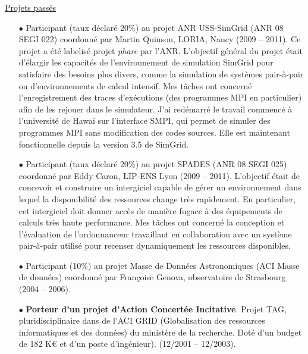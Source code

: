 \documentclass[11pt]{article}
\begin{document}
\underline{Projets passés}\\
\begin{itemize}
\item[$\bullet$]
Participant (taux déclaré 20\%) au projet ANR USS-SimGrid (ANR 08 SEGI 022) coordonné par 
Martin Quinson, LORIA, Nancy (2009 -- 2011). Ce projet a été labelisé projet \textit{phare}
par l'ANR.
L'objectif général du projet était  d'élargir les capacités 
de l'environnement de simulation SimGrid pour satisfaire des besoins plus divers, comme la
simulation de systèmes pair-à-pair ou d'environnements de calcul intensif.
Mes tâches ont concerné l'enregistrement des traces d'exécutions (des programmes MPI en 
particulier) afin de les rejouer dans le simulateur. J'ai redémarré
le travail commencé à l'université de Hawaï sur l'interface SMPI, qui permet de simuler des 
programmes MPI sans modification des codes sources. Elle est maintenant fonctionnelle depuis
la version 3.5 de SimGrid.\\


\item[$\bullet$]
Participant (taux déclaré 20\%) au projet SPADES (ANR 08 SEGI 025) coordonné par Eddy Caron, 
LIP-ENS Lyon (2009 -- 2011). L'objectif était de concevoir et construire un intergiciel capable 
de gérer un environnement dans lequel la disponibilité des ressources change très rapidement. 
En particulier, cet intergiciel doit donner accès de manière fugace à des équipements de calculs 
très haute performance. Mes tâches ont concerné la conception et l'évaluation de l'ordonnanceur
travaillant en collaboration avec un système pair-à-pair utilisé pour recenser dynamiquement
les ressources disponibles.\\


\item[$\bullet$] Participant (10\%) au projet Masse de Données Astronomiques (ACI Masse de données) 
coordonné par Françoise Genova, observatoire de Strasbourg (2004 -- 2006). \\

\item[$\bullet$]
\textbf{Porteur d'un projet d'Action Concertée Incitative}. Projet TAG, 
pluridisciplinaire dans de l'ACI GRID (Globalisation des ressources informatiques et des données) 
du ministère de la recherche. Doté d'un budget de 182 K\euro{} et d'un poste d'ingénieur). 
(12/2001 -- 12/2003).\\
\end{itemize}


\end{document}

